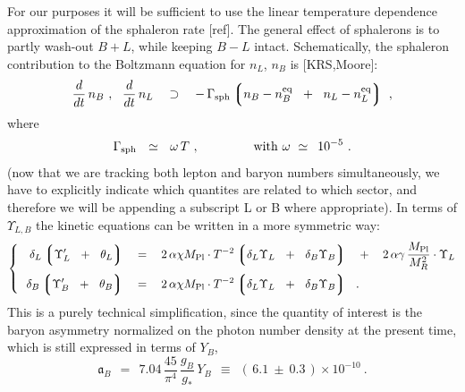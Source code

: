 \documentclass[12pt]{revtex4}
\newcommand{\eq}{{\rm eq}}
\newcommand{\lgr}{\left\lgroup}
\newcommand{\rgr}{\right\rgroup}
\newcommand{\Mpl}{M_{\rm Pl}}
\newcommand{\Gsph}{\Gamma_{\rm sph}}
\begin{document}
	For our purposes it will be sufficient to use the linear
	temperature dependence approximation of the sphaleron rate [ref]. 
	The general effect of sphalerons is to partly wash-out $ B + L $,
	while keeping $ B - L $ intact.
	Schematically, the sphaleron contribution to the Boltzmann equation
	for $ n_L $, $ n_B $ is [KRS,Moore]:
\begin{equation}
\label{sph_corr}
	\frac{d}{dt}\, n_B~,~~
	\frac{d}{dt}\, n_L
	~~~\supset~~~ -\, \Gsph 
		\lgr   n_B - n_B^\eq \;~+~\;
		       n_L - n_L^\eq 
		\rgr~,
\end{equation}
	where
\[
	\Gsph ~~\simeq~~ \omega\, T~, \qquad\qquad 
	{\rm ~with~}
	\omega ~\simeq~ \,10^{-5}~.
\]
	(now that we are tracking both lepton and baryon numbers 
	simultaneously, we have to explicitly indicate which quantites
	are related to which sector, and therefore we will be appending
	a subscript L or B where appropriate).
	In terms of $ \Upsilon_{L,B} $
	the kinetic equations can be written in a more symmetric way:
\begin{equation}
\label{eqn_ups}
\left\{~~
\begin{split}
	\delta_L \lgr \Upsilon_L' ~~+~~ \theta_L \rgr
	& ~~\;=~~\;
	2\, \alpha\chi \Mpl \cdot T^{-2} 
	\lgr \delta_L \Upsilon_L ~~+~~ \delta_B \Upsilon_B \rgr 
	\;~~+~~\;
	2\, \alpha\gamma\, \frac{\Mpl}{M_R^2} \cdot \Upsilon_L \\
	\delta_B \lgr \Upsilon_B' ~~+~~ \theta_B \rgr
	& ~~\;=~~\;
	2\, \alpha\chi \Mpl \cdot T^{-2} 
	\lgr \delta_L \Upsilon_L ~~+~~ \delta_B \Upsilon_B \rgr 
	~~.
\end{split}
\right.
\end{equation}
	This is a purely technical simplification, since
	the quantity of interest is the baryon asymmetry normalized on the
	photon number density at the present time, which is still expressed
	in terms of $ Y_B $,
\begin{equation}
\label{def_asy}
	\mathfrak{a}_B ~~=~~ 7.04\, \frac{45}{\pi^4}\, \frac{g_B}{g_*}\, Y_B
		~~\equiv~~ (\, 6.1 ~\pm~ 0.3 \,)\times 10^{-10}~.
\end{equation}
\end{document}
